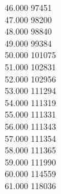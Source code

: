 { 46.000	97451 \\
 47.000	98200 \\
 48.000	98840 \\
 49.000	99384 \\
 50.000	101075 \\
 51.000	102831 \\
 52.000	102956 \\
 53.000	111294 \\
 54.000	111319 \\
 55.000	111331 \\
 56.000	111343 \\
 57.000	111354 \\
 58.000	111365 \\
 59.000	111990 \\
 60.000	114559 \\
 61.000	118036 \\
}
